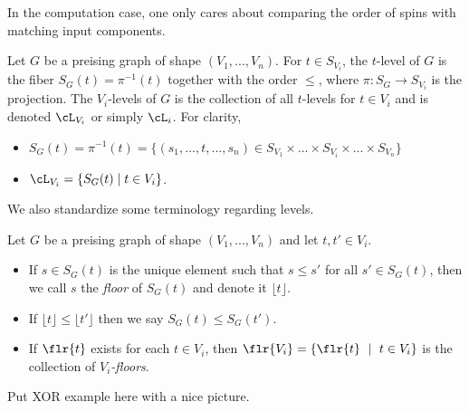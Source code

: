 In the computation case, one only cares about comparing the order of spins with matching input components.

\begin{defn}\label{defn:levels-of-preising-graph}
	Let $G$ be a preising graph of shape $(V_1,...,V_n)$. For $t \in S_{V_i}$, the $t$-level of $G$ is the fiber $S_G(t) = \pi^{-1}(t)$ together with the order $\leq$, where $\pi:S_{G}\to S_{V_i}$ is the projection. The $V_i$-levels of $G$ is the collection of all $t$-levels for $t \in V_{i}$ and is denoted $\cL_{V_i}$ or simply $\cL_i$. For clarity, 
	\begin{itemize}
		\item $S_G(t) = \pi^{-1}(t) = \{(s_1,...,t,...,s_n) \in S_{V_1}\times...\times S_{V_i}\times...\times S_{V_n}\}$
		\item $\cL_{V_i} = \{S_G(t) \mid t \in V_i\}$.
	\end{itemize}
\end{defn}
We also standardize some terminology regarding levels.
\begin{defn}\label{defn:levels-features}
	Let $G$ be a preising graph of shape $(V_1,...,V_n)$ and let $t,t' \in V_i$.
	\begin{itemize}
		\item If $s \in S_G(t)$ is the unique element such that $s \leq s'$ for all $s' \in S_G(t)$, then we call $s$ the \emph{floor} of $S_G(t)$ and denote it $\lfloor t\rfloor$.
		\item If $\lfloor t \rfloor \leq \lfloor t'\rfloor$ then we say $S_G(t) \leq S_G(t')$.
		\item If $\flr{t}$ exists for each $t \in V_i$, then $\flr {V_i} = \{\flr{t} ~\mid ~ t \in V_i\}$ is the collection of \emph{$V_i$-floors}.
	\end{itemize}
\end{defn}

\begin{example}\label{example:XOR}
	Put XOR example here with a nice picture.
\end{example}
